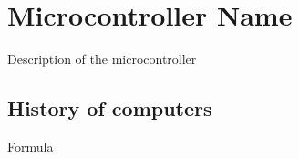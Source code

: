 
\alphafootnotes


\chapter{Microcontroller Name} 
 

\arabicfootnotes

Description of the microcontroller

\section{History of computers}

Formula

